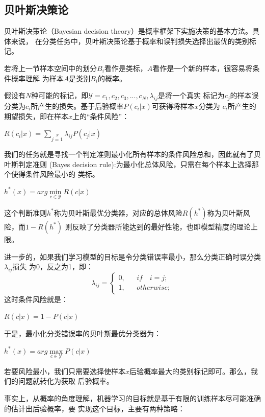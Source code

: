 \documentclass[UTF8]{ctexart}
\begin{document}
{\subsection{贝叶斯决策论}
贝叶斯决策论（Bayesian decision theory）是概率框架下实施决策的基本方法。具体来说，
在分类任务中，贝叶斯决策论基于概率和误判损失选择出最优的类别标记。\par
若将上一节样本空间中的划分$B_i$看作是类标，$A$看作是一个新的样本，很容易将条件概率理解
为样本$A$是类别$B_i$的概率。\par
假设有$N$种可能的标记，即$\mathcal Y={c_1,c_2,c_3,...,c_N,\lambda_{ij}}$是将一个真实
标记为$c_j$的样本误分类为$c_i$所产生的损失。基于后验概率$P(c_i|x)$可获得将样本$x$分类为
$c_i$所产生的期望损失，即在样本$x$上的“条件风险”：
\begin{center}
    \Large{
        $R(c_i|x)=\sum\limits_{j=1}\limits^N\lambda_{ij}P(c_j|x)$
    }
\end{center}
我们的任务就是寻找一个判定准则最小化所有样本的条件风险总和，因此就有了贝叶斯判定准则
(Bayes decision rule):为最小化总体风险，只需在每个样本上选择那个使得条件风险最小的
类标。
\begin{center}
    \Large{
        $h^*(x)=arg\min\limits_{c\in\mathcal Y}R(c|x)$
    }
\end{center}\par
这个判断准则$h^*$称为贝叶斯最优分类器，对应的总体风险$R(h^*)$称为贝叶斯风险，而$1-R(h^*)$
则反映了分类器所能达到的最好性能，也即模型精度的理论上限。\par
进一步的，如果我们学习模型的目标是令分类错误率最小，那么分类正确时误分类$\lambda_{ij}$损失
为0，反之为1，即：
\Large{
    $$\lambda_{ij}=\left\{
        \begin{aligned}
            0,&&if \quad i = j;\\
            1,&&otherwise;
        \end{aligned}
        \right.
        $$
}
这时条件风险就是：
\begin{center}
    $R(c|x)=1-P(c|x)$
\end{center}
于是，最小化分类错误率的贝叶斯最优分类器为：
\begin{center}
    $h^*(x)=arg\max\limits_{c\in\mathcal Y}P(c|x)$
\end{center}
若要风险最小，我们只需要选择使样本$x$后验概率最大的类别标记即可。那么，我们的问题就转化为获取
后验概率。\par
事实上，从概率的角度理解，机器学习的目标就是基于有限的训练样本尽可能准确的估计出后验概率，要
实现这个目标，主要有两种策略：\\[2ex]
}
\end{document}
